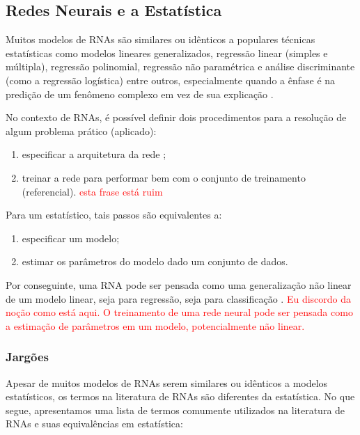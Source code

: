 \documentclass{automatextcc}
\newcommand{\pumi}[1]{\textcolor{red}{#1}}
\begin{document}
\subsection{Redes Neurais e a Estatística}
Muitos modelos de RNAs são similares ou idênticos a populares técnicas estatísticas como modelos lineares generalizados, regressão linear (simples e múltipla), regressão polinomial, regressão não paramétrica e análise discriminante (como a regressão logística) entre outros, especialmente quando a ênfase é na predição de um fenômeno complexo em vez de sua explicação \citep{sarle1994, cheng1994}.

No contexto de RNAs, é possível definir dois procedimentos para a resolução de algum problema prático (aplicado):
\begin{enumerate}[label=(\roman*)]
  \item especificar a arquitetura da rede ;
  \item treinar a rede para performar bem com o conjunto de treinamento (referencial). \pumi{ esta frase está ruim} 
\end{enumerate}
Para um estatístico, tais passos são equivalentes a: 
\begin{enumerate}[label=(\roman*)]
  \item especificar um modelo;
  \item estimar os parâmetros do modelo dado um conjunto de dados.
\end{enumerate}  
Por conseguinte, uma RNA pode ser pensada como uma generalização não linear de um modelo linear, seja para regressão, seja para classificação \citep{cheng1994, hastie2009}. \pumi{Eu discordo da noção como está aqui. O treinamento de uma rede neural pode ser pensada como a estimação de parâmetros em um modelo, potencialmente não linear.}



\subsubsection{Jargões} 
Apesar de muitos modelos de RNAs serem similares ou idênticos a modelos estatísticos, os termos na literatura de RNAs são diferentes da estatística. No que segue, apresentamos uma lista de termos comumente utilizados na literatura de RNAs e suas equivalências em estatística:
\end{document}
